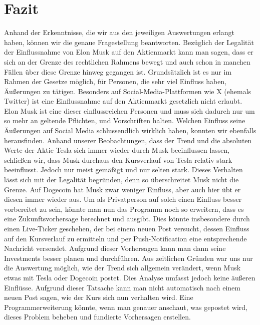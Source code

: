 \documentclass{article}
\begin{document}
\section{Fazit} \label{Fazit}
Anhand der Erkenntnisse, die wir aus den jeweiligen Auswertungen erlangt haben, können wir die genaue Fragestellung beantworten.
Bezüglich der Legalität der Einflussnahme von Elon Musk auf den Aktienmarkt kann man sagen, dass er sich an der Grenze des rechtlichen Rahmens bewegt und auch schon in manchen Fällen über diese Grenze hinweg gegangen ist.
Grundsätzlich ist es nur im Rahmen der Gesetze möglich, für Personen, die sehr viel Einfluss haben, Äußerungen zu tätigen.
Besonders auf Social-Media-Plattformen wie X (ehemals Twitter) ist eine Einflussnahme auf den Aktienmarkt gesetzlich nicht erlaubt.
Elon Musk ist eine dieser einflussreichen Personen und muss sich dadurch nur um so mehr an geltende Pflichten, und Vorschriften halten.
Welchen Einfluss seine Äußerungen auf Social Media schlussendlich wirklich haben, konnten wir ebenfalls herausfinden.
Anhand unserer Beobachtungen, dass der Trend und die absoluten Werte der Aktie Tesla sich immer wieder durch Musk beeinflussen lassen, schließen wir, dass Musk durchaus den Kursverlauf von Tesla relativ stark beeinflusst.
Jedoch nur meist gemäßigt und nur selten stark.
Dieses Verhalten lässt sich mit der Legalität begründen, denn so überschreitet Musk nicht die Grenze.
Auf Dogecoin hat Musk zwar weniger Einfluss, aber auch hier übt er diesen immer wieder aus.
Um als Privatperson auf solch einen Einfluss besser vorbereitet zu sein, könnte man nun das Programm noch so erweitern, dass es eine Zukunftsvorhersage berechnet und ausgibt. 
Dies könnte insbesondere durch einen Live-Ticker geschehen, der bei einem neuen Post versucht, dessen Einfluss auf den Kursverlauf zu ermitteln und per Push-Notification eine entsprechende Nachricht versendet.
Aufgrund dieser Vorhersagen kann man dann seine Investments besser planen und durchführen.
Aus zeitlichen Gründen war uns nur die Auswertung möglich, wie der Trend sich allgemein verändert, wenn Musk etwas mit Tesla oder Dogecoin postet.
Dies Analyse umfasst jedoch keine äußeren Einflüsse.
Aufgrund dieser Tatsache kann man nicht automatisch nach einem neuen Post sagen, wie der Kurs sich nun verhalten wird.
Eine Programmerweiterung könnte, wenn man genauer anschaut, was gepostet wird, dieses Problem beheben und fundierte Vorhersagen erstellen.
\end{document}
